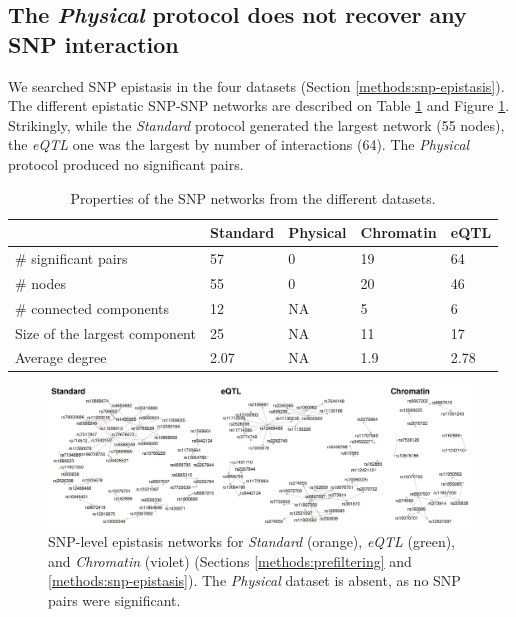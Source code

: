 \documentclass[
  11pt,
]{env/yjiao}
\begin{document}
\hypertarget{the-physical-protocol-does-not-recover-any-snp-interaction}{%
\subsection{\texorpdfstring{The \emph{Physical} protocol does not recover any SNP interaction}{The Physical protocol does not recover any SNP interaction}}\label{the-physical-protocol-does-not-recover-any-snp-interaction}}

We searched SNP epistasis in the four datasets (Section
\ref{methods:snp-epistasis}). The different epistatic SNP-SNP networks are
described on Table \ref{tab:snp-network} and Figure
\ref{fig:snp-networks}. Strikingly, while the \emph{Standard} protocol generated the
largest network (55 nodes), the \emph{eQTL} one was the largest by number of
interactions (64). The \emph{Physical} protocol produced no significant pairs.

\begin{table}

\caption{\label{tab:snp-network}Properties of the SNP networks from the different datasets.}
\centering
\begin{tabular}[t]{lllll}
\toprule
 & Standard & Physical & Chromatin & eQTL\\
\midrule
\rowcolor{gray!6}  \# significant pairs & 57 & 0 & 19 & 64\\
\# nodes & 55 & 0 & 20 & 46\\
\rowcolor{gray!6}  \# connected components & 12 & NA & 5 & 6\\
Size of the largest component & 25 & NA & 11 & 17\\
\rowcolor{gray!6}  Average degree & 2.07 & NA & 1.9 & 2.78\\
\bottomrule
\end{tabular}
\end{table}



\begin{figure}
\centering
\includegraphics{fig/snp_networks.pdf}
\caption{\label{fig:snp-networks}SNP-level epistasis networks for \emph{Standard} (orange), \emph{eQTL} (green), and \emph{Chromatin} (violet) (Sections \ref{methods:prefiltering} and \ref{methods:snp-epistasis}). The \emph{Physical} dataset is absent, as no SNP pairs were significant.}
\end{figure}
\end{document}
